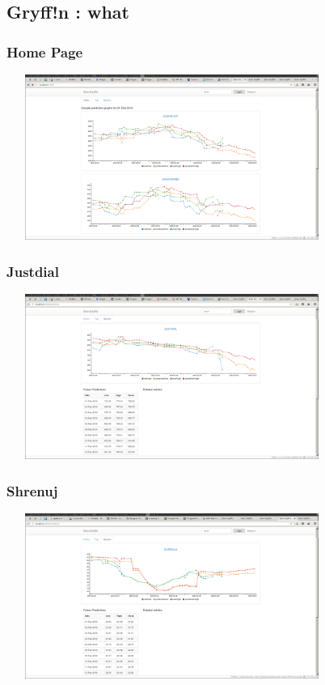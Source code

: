 \documentclass{beamer}
\begin{document}
\subsection{Gryff!n : what}
\begin{frame}
  \frametitle{Home Page}
  \includegraphics[height=5.4cm,width=10.8cm]{screenshot_2017-05-20_07-34-04.png}
\end{frame}
\begin{frame}
  \frametitle{Justdial}
  \includegraphics[height=5.4cm,width=10.8cm]{screenshot_2017-05-20_07-34-30.png}
\end{frame}
\begin{frame}
  \frametitle{Shrenuj}
  \includegraphics[height=5.4cm,width=10.8cm]{screenshot_2017-05-20_07-36-50.png}
\end{frame}
\end{document}
